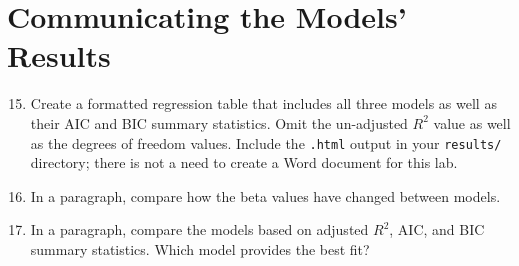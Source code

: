 \documentclass{tufte-handout}
\begin{document}
\vspace{3mm}
\section{Communicating the Models' Results}
\begin{enumerate}
\setcounter{enumi}{14}
\item Create a formatted regression table that includes all three models as well as their AIC and BIC summary statistics. Omit the un-adjusted $R^2$ value as well as the degrees of freedom values. Include the \texttt{.html} output in your \texttt{results/} directory; there is not a need to create a Word document for this lab.
\item In a paragraph, compare how the beta values have changed between models.
\item In a paragraph, compare the models based on adjusted $R^2$, AIC, and BIC summary statistics. Which model provides the best fit?
\end{enumerate}

\end{document}
